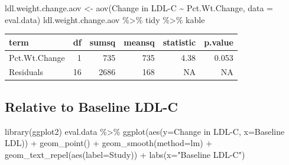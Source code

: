 \documentclass[
]{article}
\newenvironment{Shaded}{\begin{snugshade}}{\end{snugshade}}
\newcommand{\AttributeTok}[1]{\textcolor[rgb]{0.77,0.63,0.00}{#1}}
\newcommand{\FunctionTok}[1]{\textcolor[rgb]{0.00,0.00,0.00}{#1}}
\newcommand{\NormalTok}[1]{#1}
\newcommand{\OtherTok}[1]{\textcolor[rgb]{0.56,0.35,0.01}{#1}}
\newcommand{\SpecialCharTok}[1]{\textcolor[rgb]{0.00,0.00,0.00}{#1}}
\newcommand{\StringTok}[1]{\textcolor[rgb]{0.31,0.60,0.02}{#1}}
\begin{document}
\begin{Shaded}
\begin{Highlighting}[]
\NormalTok{ldl.weight.change.aov }\OtherTok{\textless{}{-}} \FunctionTok{aov}\NormalTok{(}\StringTok{\textasciigrave{}}\AttributeTok{Change in LDL{-}C}\StringTok{\textasciigrave{}} \SpecialCharTok{\textasciitilde{}} \StringTok{\textasciigrave{}}\AttributeTok{Pct.Wt.Change}\StringTok{\textasciigrave{}}\NormalTok{, }\AttributeTok{data =}\NormalTok{ eval.data)}
\NormalTok{ldl.weight.change.aov }\SpecialCharTok{\%\textgreater{}\%}\NormalTok{ tidy }\SpecialCharTok{\%\textgreater{}\%}\NormalTok{ kable}
\end{Highlighting}
\end{Shaded}

\begin{longtable}[]{@{}lrrrrr@{}}
\toprule
term & df & sumsq & meansq & statistic & p.value \\
\midrule
\endhead
Pct.Wt.Change & 1 & 735 & 735 & 4.38 & 0.053 \\
Residuals & 16 & 2686 & 168 & NA & NA \\
\bottomrule
\end{longtable}

\hypertarget{relative-to-baseline-ldl-c}{%
\subsection{Relative to Baseline
LDL-C}\label{relative-to-baseline-ldl-c}}

\begin{Shaded}
\begin{Highlighting}[]
\FunctionTok{library}\NormalTok{(ggplot2)}
\NormalTok{eval.data }\SpecialCharTok{\%\textgreater{}\%}
  \FunctionTok{ggplot}\NormalTok{(}\FunctionTok{aes}\NormalTok{(}\AttributeTok{y=}\StringTok{\textasciigrave{}}\AttributeTok{Change in LDL{-}C}\StringTok{\textasciigrave{}}\NormalTok{,}
             \AttributeTok{x=}\StringTok{\textasciigrave{}}\AttributeTok{Baseline LDL}\StringTok{\textasciigrave{}}\NormalTok{)) }\SpecialCharTok{+}
  \FunctionTok{geom\_point}\NormalTok{() }\SpecialCharTok{+}
  \FunctionTok{geom\_smooth}\NormalTok{(}\AttributeTok{method=}\StringTok{\textquotesingle{}lm\textquotesingle{}}\NormalTok{) }\SpecialCharTok{+}
  \FunctionTok{geom\_text\_repel}\NormalTok{(}\FunctionTok{aes}\NormalTok{(}\AttributeTok{label=}\NormalTok{Study)) }\SpecialCharTok{+}
  \FunctionTok{labs}\NormalTok{(}\AttributeTok{x=}\StringTok{"Baseline LDL{-}C"}\NormalTok{)}
\end{Highlighting}
\end{Shaded}
\end{document}
